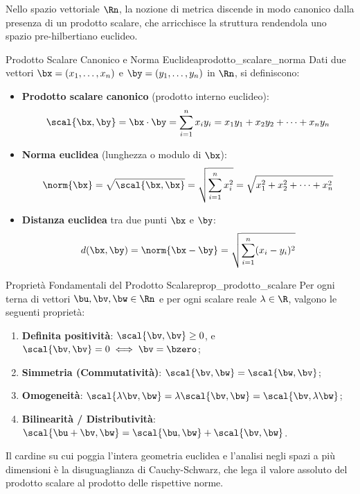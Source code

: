Nello spazio vettoriale $\Rn$, la nozione di metrica discende in modo canonico dalla presenza di un prodotto scalare, che arricchisce la struttura rendendola uno spazio pre-hilbertiano euclideo.

\begin{definizione}{Prodotto Scalare Canonico e Norma Euclidea}{prodotto_scalare_norma}
Dati due vettori $\bx = (x_1, \dots, x_n)$ e $\by = (y_1, \dots, y_n)$ in $\Rn$, si definiscono:
\begin{itemize}
    \item \textbf{Prodotto scalare canonico} (prodotto interno euclideo):
    \[
    \scal{\bx, \by} = \bx \cdot \by = \sum_{i=1}^{n} x_i y_i = x_1 y_1 + x_2 y_2 + \dots + x_n y_n
    \]
    \item \textbf{Norma euclidea} (lunghezza o modulo di $\bx$):
    \[
    \norm{\bx} = \sqrt{\scal{\bx, \bx}} = \sqrt{\sum_{i=1}^{n} x_i^2} = \sqrt{x_1^2 + x_2^2 + \dots + x_n^2}
    \]
    \item \textbf{Distanza euclidea} tra due punti $\bx$ e $\by$:
    \[
    d(\bx, \by) = \norm{\bx - \by} = \sqrt{\sum_{i=1}^{n} (x_i - y_i)^2}
    \]
\end{itemize}
\end{definizione}

\begin{proposizione}{Proprietà Fondamentali del Prodotto Scalare}{prop_prodotto_scalare}
Per ogni terna di vettori $\bu, \bv, \bw \in \Rn$ e per ogni scalare reale $\lambda \in \R$, valgono le seguenti proprietà:
\begin{enumerate}
    \item \textbf{Definita positività}: $\scal{\bv, \bv} \ge 0$, e $\scal{\bv, \bv} = 0 \iff \bv = \bzero$;
    \item \textbf{Simmetria (Commutatività)}: $\scal{\bv, \bw} = \scal{\bw, \bv}$;
    \item \textbf{Omogeneità}: $\scal{\lambda \bv, \bw} = \lambda \scal{\bv, \bw} = \scal{\bv, \lambda \bw}$;
    \item \textbf{Bilinearità / Distributività}: $\scal{\bu + \bv, \bw} = \scal{\bu, \bw} + \scal{\bv, \bw}$.
\end{enumerate}
\end{proposizione}

Il cardine su cui poggia l'intera geometria euclidea e l'analisi negli spazi a più dimensioni è la disuguaglianza di Cauchy-Schwarz, che lega il valore assoluto del prodotto scalare al prodotto delle rispettive norme.

